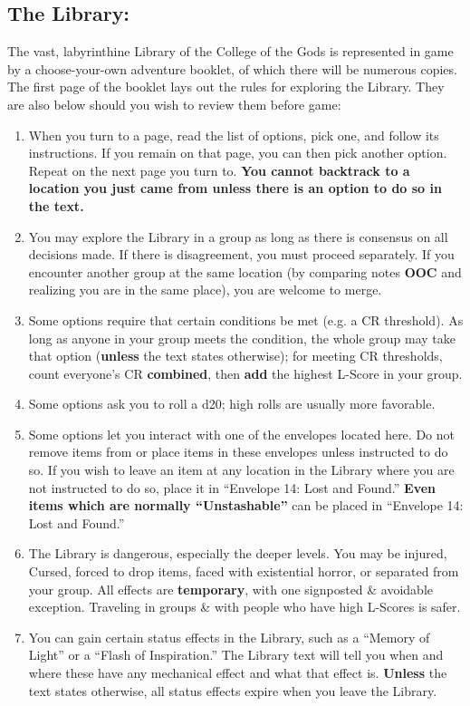 \documentclass[sheet]{GL2020}
\begin{document}
{\subsection{The Library:}
The vast, labyrinthine Library of the College of the Gods is represented in game by a choose-your-own adventure booklet, of which there will be numerous copies. The first page of the booklet lays out the rules for exploring the Library. They are also below should you wish to review them before game:

\begin{enumerate}
	\item When you turn to a page, read the list of options, pick one, and follow its instructions. If you remain on that page, you can then pick another option. Repeat on the next page you turn to. \textbf{You cannot backtrack to a location you just came from unless there is an option to do so in the text.}
	\item You may explore the Library in a group as long as there is consensus on all decisions made. If there is disagreement, you must proceed separately. If you encounter another group at the same location (by comparing notes \textbf{OOC} and realizing you are in the same place), you are welcome to merge.
	\item Some options require that certain conditions be met (e.g. a CR threshold). As long as anyone in your group meets the condition, the whole group may take that option (\textbf{unless} the text states otherwise); for meeting CR thresholds, count everyone’s CR \textbf{combined}, then \textbf{add} the highest L-Score in your group. 
	\item Some options ask you to roll a d20; high rolls are usually more favorable. 
	\item Some options let you interact with one of the envelopes located here. Do not remove items from or place items in these envelopes unless instructed to do so. If you wish to leave an item at any location in the Library where you are not instructed to do so, place it in “Envelope 14: Lost and Found.” \textbf{Even items which are normally “Unstashable”} can be placed in “Envelope 14: Lost and Found.”
	\item The Library is dangerous, especially the deeper levels. You may be injured, Cursed, forced to drop items, faced with existential horror, or separated from your group. All effects are \textbf{temporary}, with one signposted & avoidable exception. Traveling in groups & with people who have high L-Scores is safer.
	\item You can gain certain status effects in the Library, such as a “Memory of Light” or a “Flash of Inspiration.” The Library text will tell you when and where these have any mechanical effect and what that effect is. \textbf{Unless} the text states otherwise, all status effects expire when you leave the Library.

\end{enumerate}}
\end{document}
